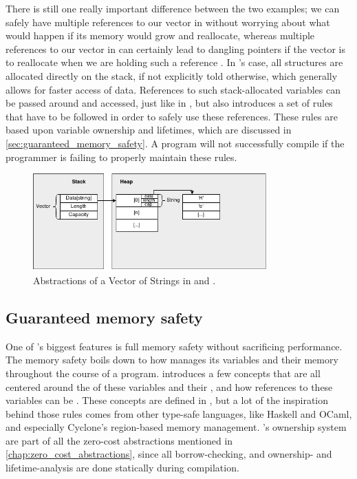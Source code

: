 There is still one really important difference between the two examples; we can safely have multiple references to our vector in {\Java} without worrying about what would happen if its memory would grow and reallocate, whereas multiple references to our vector in {\Cpp} can certainly lead to dangling pointers if the vector is to reallocate when we are holding such a reference
.
In {\rust}'s case, all structures are allocated directly on the stack, if not explicitly told otherwise, which generally allows for faster access of data.
References to such stack-allocated variables can be passed around and accessed, just like in {\Cpp},
but {\rust} also introduces a set of rules that have to be followed in order to safely use these references.
These rules are based upon variable ownership and lifetimes, which are discussed in \autoref{sec:guaranteed_memory_safety}.
A {\rust} program will not successfully compile if the programmer is failing to properly maintain these rules.

\begin{figure}[tb]
  \begin{center}
    \includegraphics[width=0.8\textwidth]{figures/cpp_abstractions}
  \end{center}
  \caption{Abstractions of a Vector of Strings in {\rust} and {\Cpp}.}
  \label{fig:cpp_abstractions}
\end{figure}

\subsection{Guaranteed memory safety}
\label{sec:guaranteed_memory_safety}

One of {\rust}'s biggest features is full memory safety without sacrificing performance.
The memory safety boils down to how {\rust} manages its variables and their memory throughout the course of a program.
{\rust} introduces a few concepts that are all centered around the  of these variables and their , and how references to these variables can be .
These concepts are defined in {\rust}, but a lot of the inspiration behind those rules comes from other type-safe languages, like Haskell and OCaml, and especially Cyclone's \cite{Grossman2002,Swamy2006} region-based memory management.
\rust's ownership system are part of all the zero-cost abstractions mentioned in \autoref{chap:zero_cost_abstractions}, since all borrow-checking, and ownership- and lifetime-analysis are done statically during compilation.

